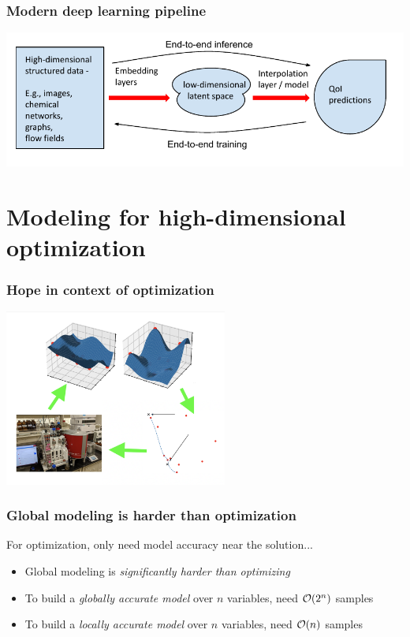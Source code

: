 \documentclass[aspectratio=169]{beamer}
\begin{document}
\begin{frame}
\frametitle{Modern deep learning pipeline}

\includegraphics{../img/delaunay_new/interpolating_latent_space.pdf}

\end{frame}

\section{Modeling for high-dimensional optimization}

\begin{frame}
\frametitle{Hope in context of optimization}

\begin{center}
\includegraphics[width=0.55\textwidth]{../img/moo_new/iclr-thumbnail.png}
\end{center}

\end{frame}

\begin{frame}
\frametitle{Global modeling is harder than optimization}

For optimization, only need model accuracy near the solution...

\begin{itemize}
\item Global modeling is {\sl significantly harder than optimizing}
\item To build a {\sl globally accurate model} over $n$ variables, need ${\cal O}(2^n)$ samples
\item To build a {\sl locally accurate model} over $n$ variables, need ${\cal O}(n)$ samples
\end{itemize}
\end{frame}
\end{document}
